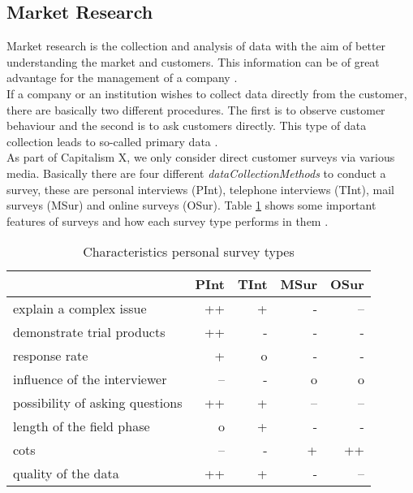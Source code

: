 \subsection{Market Research} \label{market_research_simulation}

Market research is the collection and analysis of data with the aim of better understanding the market and customers. This information can be of great advantage for the management of a company \cite[Chapter~1.2]{mooi_introduction_2018}.\\

If a company or an institution wishes to collect data directly from the customer, there are basically two different procedures. The first is to observe customer behaviour and the second is to ask customers directly. This type of data collection leads to so-called primary data \cite[Chapter~4.4]{mooi_getting_2018}.\\

As part of Capitalism X, we only consider direct customer surveys via various media. Basically there are four different \textit{dataCollectionMethods} to conduct a survey, these are personal interviews (\gls{PInt}), telephone interviews (\gls{TInt}), mail surveys (\gls{MSur}) and online surveys (\gls{OSur}). Table \ref{MR_survey_types_characteristics} shows some important features of surveys and how each survey type performs in them \cite[Chapter~4.4.2.2]{mooi_getting_2018}.\\

\begin{table}[ht]
\centering
\begin{tabular}{|l|r|r|r|r|}
\hline
                                & PInt    & TInt    & MSur   & OSur \\
\hline                              
explain a complex issue         & ++    & +     & -    & --  \\
demonstrate trial products      & ++    & -     & -    & -   \\
response rate                   & +     & o     & -    & -   \\
influence of the interviewer    & --    & -     & o    & o   \\
possibility of asking questions & ++    & +     & --   & --  \\
length of the field phase       & o     & +     & -    & -   \\
cots                            & --    & -     & +    & ++  \\
quality of the data             & ++    & +     & -    & --  \\
\hline
\end{tabular}
\caption{Characteristics personal survey types}
\label{MR_survey_types_characteristics}
\end{table}

